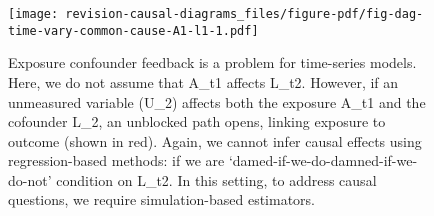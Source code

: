 \documentclass[
  singlecolumn,
  9pt]{article}
\begin{document}
\begin{figure}

{\centering \texttt{[image: revision-causal-diagrams\_files/figure-pdf/fig-dag-time-vary-common-cause-A1-l1-1.pdf]}

}

\caption{\label{fig-dag-time-vary-common-cause-A1-l1}Exposure confounder
feedback is a problem for time-series models. Here, we do not assume
that A\_t1 affects L\_t2. However, if an unmeasured variable (U\_2)
affects both the exposure A\_t1 and the cofounder L\_2, an unblocked
path opens, linking exposure to outcome (shown in red). Again, we cannot
infer causal effects using regression-based methods: if we are
`damed-if-we-do-damned-if-we-do-not' condition on L\_t2. In this
setting, to address causal questions, we require simulation-based
estimators.}

\end{figure}
\end{document}
